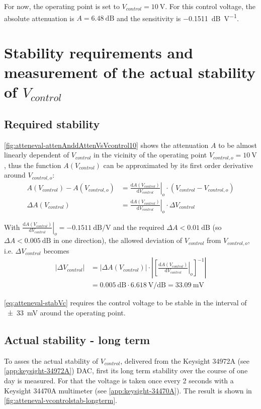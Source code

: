 

For now, the operating point is set to $V_{control}=\SI{10}{\volt}$. For this control voltage, the absolute attenuation is $A=\SI{6.48}{\dB}$ and the sensitivity is \SI{-0.1511}{\dB\per\volt}.

\FloatBarrier
\newpage
\section{Stability requirements and measurement of the actual stability of $V_{control}$}
\subsection{Required stability}
\autoref{fig:atteneval-attenAnddAttenVsVcontrol10} shows the attenuation $A$ to be almost linearly dependent of $V_{control}$ in the vicinity of the operating point $V_{control,o}=\SI{10}{\volt}$, thus the function $A(V_{control})$ can be approximated by its first order derivative around $V_{control,o}$:
\begin{align}
A(V_{control}) - A(V_{control,o}) &= \left.\frac{\text{d}A(V_{control})}{\text{d}V_{control}}\right|_{o} \cdot 
\left( V_{control} - V_{control,o}\right)\\
\Delta A(V_{control}) &= \left.\frac{\text{d}A(V_{control})}{\text{d}V_{control}}\right|_{o} \cdot \Delta V_{control}
\end{align}

With $\left.\frac{\text{d}A(V_{control})}{\text{d}V_{control}}\right|_{o} = \SI{-0.1511}{\dB\per\volt}$ and the required $\Delta A < \SI{0.01}{\dB}$ (so $\Delta A < \SI{0.005}{\dB}$ in one direction), the allowed deviation of $V_{control}$ from $V_{control,o}$, i.e. $\Delta V_{control}$ becomes
\begin{align}\label{eq:atteneval-stabVc}
\left|\Delta V_{control}\right| &= \left|\Delta A(V_{control})\right| \cdot 
\left|\left[\left.\frac{\text{d}A(V_{control})}{\text{d}V_{control}}\right|_{o}\right]^{-1}\right| \\
 &= \SI{0.005}{\dB} \cdot \SI{6.618}{\volt\per\dB} = \SI{33.09}{\milli\volt}
\end{align}

\autoref{eq:atteneval-stabVc} requires the control voltage to be stable in the interval of \SI{\pm33}{\mV} around the operating point.

\FloatBarrier
\subsection{Actual stability - long term}
To asses the actual stability of $V_{control}$, delivered from the Keysight 34972A (see \autoref{app:keysight-34972A}) DAC, first its long term stability over the course of one day is measured. For that the voltage is taken once every 2 seconds with a Keysight 34470A multimeter (see \autoref{app:keysight-34470A}). The result is shown in \autoref{fig:atteneval-vcontrolstab-longterm}.

